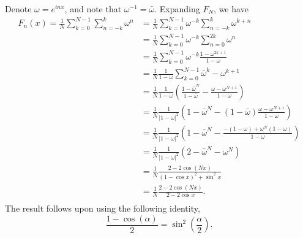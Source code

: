 \documentclass{homework}
\begin{document}

\begin{solution}
  Denote $\omega = e^{inx}$, and note that $\omega^{-1} = \bar \omega$. Expanding $F_N$, we have
\begin{align*}
  F_n(x) = \frac 1N \sum_{k=0}^{N-1} \sum_{n=-k}^k \omega^n
  &= \frac 1N \sum_{k=0}^{N-1} \omega^{-k} \sum_{n=-k}^k \omega^{k+n}\\
  &= \frac 1N \sum_{k=0}^{N-1} \omega^{-k} \sum_{n=0}^{2k} \omega^{n}\\
  &= \frac 1N \sum_{k=0}^{N-1} \omega^{-k}\frac{1 - \omega^{2k+1}}{1-\omega}\\
  &= \frac 1N \frac1{1-\omega} \sum_{k=0}^{N-1} \bar \omega^{k} - \omega^{k+1}\\
  &= \frac 1N \frac1{1-\omega} \left(\frac{1 - \bar \omega^{N}}{1-\bar \omega} - \frac{\omega - \omega^{N+1}}{1-\omega}\right)\\
  &= \frac 1N \frac1{|1-\omega|^2} \left(1 - \bar \omega^{N} - (1-\bar \omega)\frac{\omega - \omega^{N+1}}{1-\omega}\right)\\
  &= \frac 1N \frac1{|1-\omega|^2} \left(1 - \bar \omega^{N} - \frac{-(1-\omega) + \omega^N(1-\omega)}{1-\omega}\right)\\
  &= \frac 1N \frac1{|1-\omega|^2} \left(2 - \bar \omega^{N} - \omega^N\right)\\
  &= \frac 1N \frac{2 - 2\cos(Nx)}{(1-\cos x)^2 + \sin^2 x}\\
  &= \frac 1N \frac{2 - 2\cos(Nx)}{2-2\cos x}.\\
\end{align*}
The result follows upon using the following identity,
$$
  \frac{1 - \cos(\alpha)}{2} =\sin^2\left(\frac\alpha2\right).
$$
\end{solution}

%
%
\newpage
{}
\end{document}
